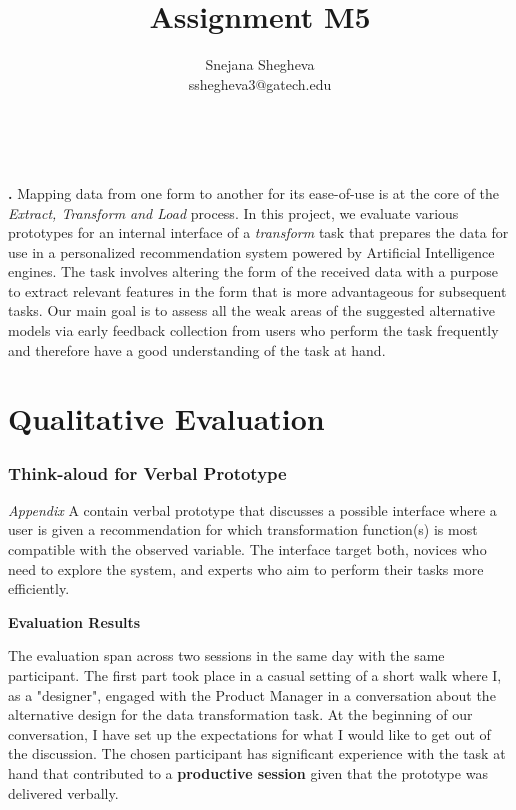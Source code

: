 \documentclass[12pt,letterpaper]{article}
\makeatletter
\renewcommand{\maketitle}{\bgroup
   \begin{center}
   \textbf{{\fontsize{18pt}{20}\selectfont \@title}}\\
   \vspace{10pt}
   {\fontsize{12pt}{0}\selectfont \@author} 
   \end{center}
}
\newenvironment{myquote}[1]%
  {\list{}{\leftmargin=#1\rightmargin=#1}\item[]}%
  {\endlist}
\renewenvironment{abstract}
{\vspace*{-.5in}\fontsize{12pt}{12}\begin{myquote}{.5in}
\noindent \par{\bfseries \abstractname.}}
{\medskip\noindent
\end{myquote}
}
\makeatother
\begin{document}
\title{Assignment M5}
\author{Snejana Shegheva \\ sshegheva3@gatech.edu}

\maketitle
\thispagestyle{fancy}

\begin{abstract}
Mapping data from one form to another for its ease-of-use is at the core of the \textit{Extract, Transform and Load} process. In this project, we evaluate various prototypes for an internal interface of a \textit{transform} task that prepares the data for use in a personalized recommendation system powered by Artificial Intelligence engines. The task involves altering the form of the received data with a purpose to extract relevant features in the form that is more advantageous for subsequent tasks. Our main goal is to assess all the weak areas of the suggested alternative models via early feedback collection from users who perform the task frequently and therefore have a good understanding of the task at hand.  
\end{abstract}

\section*{Qualitative Evaluation}
\subsubsection*{Think-aloud for Verbal Prototype}
\textit{Appendix} A contain verbal prototype that discusses a possible interface where a user is given a recommendation for which transformation function(s) is most compatible with the observed variable. The interface target both, novices who need to explore the system, and experts who aim to perform their tasks more efficiently.

\textbf{Evaluation Results}

The evaluation span across two sessions in the same day with the same participant. The first part took place in a casual setting of a short walk where I, as a "designer", engaged with the Product Manager in a conversation about the alternative design for the data transformation task. At the beginning of our conversation, I have set up the expectations for what I would like to get out of the discussion. The chosen participant has significant experience with the task at hand that contributed to a \textbf{productive session} given that the prototype was delivered verbally.
\end{document}
